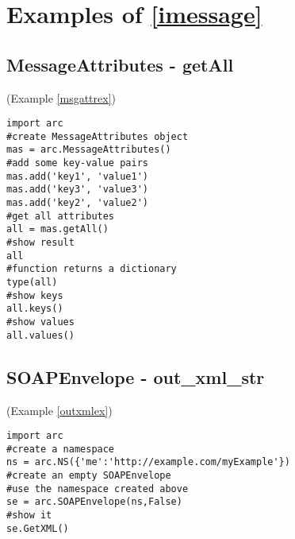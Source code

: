 \section{Examples of \ref{imessage}}
\subsection{MessageAttributes - getAll}
(Example \ref{msgattrex})
\label{cmsgattrex}
\begin{verbatim}
import arc
#create MessageAttributes object
mas = arc.MessageAttributes()
#add some key-value pairs
mas.add('key1', 'value1')
mas.add('key3', 'value3')
mas.add('key2', 'value2')
#get all attributes
all = mas.getAll()
#show result
all
#function returns a dictionary
type(all)
#show keys
all.keys()
#show values
all.values()
\end{verbatim}

\subsection{SOAPEnvelope - out\_xml\_str}
(Example \ref{outxmlex})
\label{coutxmlex}
\begin{verbatim}
import arc
#create a namespace
ns = arc.NS({'me':'http://example.com/myExample'})
#create an empty SOAPEnvelope
#use the namespace created above
se = arc.SOAPEnvelope(ns,False)
#show it
se.GetXML()
\end{verbatim}

